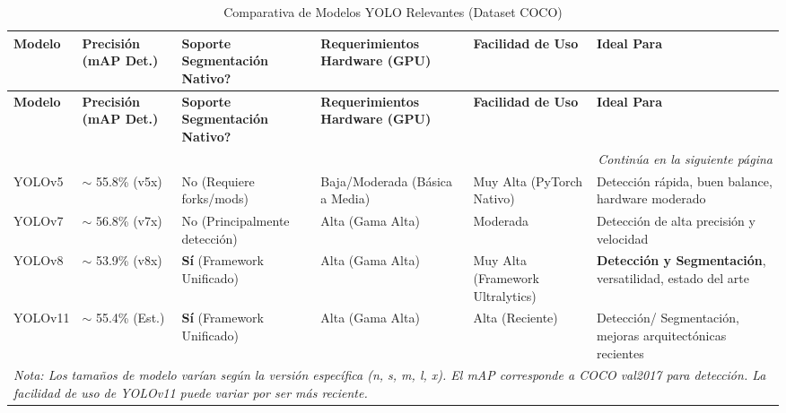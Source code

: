 \renewcommand{\arraystretch}{1.3}
\begin{longtable}{
    |p{1.6cm}  %
    |p{1.7cm}         %
    |p{2.4cm}         %
    |p{2.9cm}  %
    |p{2.1cm}         %
    |p{3.5cm}| %
}
\caption{Comparativa de Modelos YOLO Relevantes (Dataset COCO)} \label{tab:comparativa_yolo_condensada} \\
\hline
\textbf{Modelo} & 
\textbf{Precisión (mAP Det.)} & 
\textbf{Soporte Segmentación Nativo?} & 
\textbf{Requerimientos Hardware (GPU)} & 
\textbf{Facilidad de Uso} & 
\textbf{Ideal Para} \\ 
\hline
\endfirsthead

\hline
\textbf{Modelo} & 
\textbf{Precisión (mAP Det.)} & 
\textbf{Soporte Segmentación Nativo?} & 
\textbf{Requerimientos Hardware (GPU)} & 
\textbf{Facilidad de Uso} & 
\textbf{Ideal Para} \\ 
\hline
\endhead

\hline
\multicolumn{6}{r}{\textit{Continúa en la siguiente página}} \\
\endfoot

\hline
\endlastfoot

YOLOv5 
& $\sim$ 55.8\% (v5x)
& No (Requiere forks/mods)
& Baja/Moderada (Básica a Media)
& Muy Alta (PyTorch Nativo)
& Detección rápida, buen balance, hardware moderado \\ \hline

YOLOv7 
& $\sim$ 56.8\% (v7x)
& No (Principalmente detección)
& Alta (Gama Alta)
& Moderada
& Detección de alta precisión y velocidad \\ \hline

YOLOv8 
& $\sim$ 53.9\% (v8x)
& \textbf{Sí} (Framework Unificado)
& Alta (Gama Alta)
& Muy Alta (Framework Ultralytics)
& \textbf{Detección y Segmentación}, versatilidad, estado del arte \\ \hline

YOLOv11 
& $\sim$ 55.4\% (Est.)
& \textbf{Sí} (Framework Unificado)
& Alta (Gama Alta)
& Alta (Reciente)
& Detección/ Segmentación, mejoras arquitectónicas recientes \\ \hline

\multicolumn{6}{p{16cm}}{\footnotesize \textit{Nota: Los tamaños de modelo varían según la versión específica (n, s, m, l, x). El mAP corresponde a COCO val2017 para detección. La facilidad de uso de YOLOv11 puede variar por ser más reciente.}} \\

\end{longtable}


